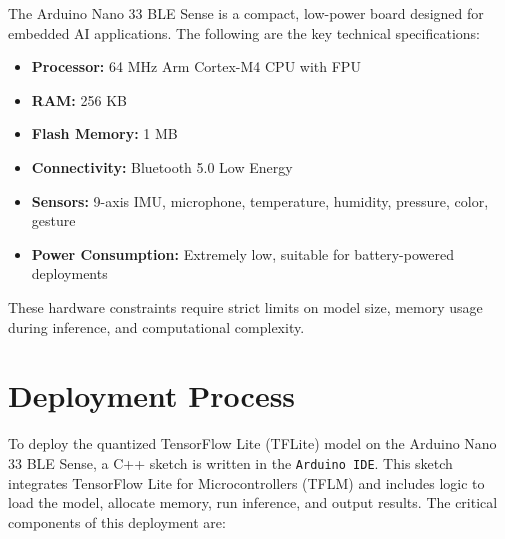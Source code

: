The Arduino Nano 33 BLE Sense is a compact, low-power board designed for embedded AI applications. The following are the key technical specifications:

\begin{itemize}
\item \textbf{Processor:} 64 MHz Arm Cortex-M4 CPU with FPU
\item \textbf{RAM:} 256 KB
\item \textbf{Flash Memory:} 1 MB
\item \textbf{Connectivity:} Bluetooth 5.0 Low Energy
\item \textbf{Sensors:} 9-axis IMU, microphone, temperature, humidity, pressure, color, gesture
\item \textbf{Power Consumption:} Extremely low, suitable for battery-powered deployments
\end{itemize}

These hardware constraints require strict limits on model size, memory usage during inference, and computational complexity.

\section{Deployment Process}

To deploy the quantized TensorFlow Lite (TFLite) model on the Arduino Nano 33 BLE Sense, a C++ sketch is written in the \texttt{Arduino IDE}. This sketch integrates TensorFlow Lite for Microcontrollers (TFLM) and includes logic to load the model, allocate memory, run inference, and output results. The critical components of this deployment are:

